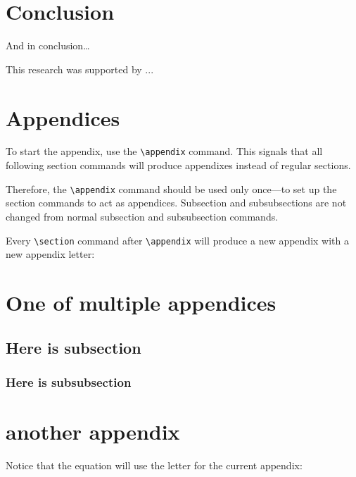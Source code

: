 \documentclass[reprint]{JASA}
\begin{document}
\section{\label{sec:5}Conclusion}

And in conclusion\ldots

\begin{acknowledgments}
This research was supported by  ...
\end{acknowledgments}



\section{Appendices}

To start the appendix, use the \verb+\appendix+ command.
This signals that all following section commands will produce appendixes
instead of regular sections. 

Therefore, the \verb+\appendix+ command
should be used only once---to set up the section commands to act as
appendices. Subsection and subsubsections are not changed from normal subsection
and subsubsection commands.

Every \verb+\section+ command after \verb+\appendix+ will produce a new appendix with 
a new appendix letter:

\appendix
\section{One of multiple appendices}
\subsection{Here is subsection}
\subsubsection{Here is subsubsection}


\section{another appendix}
Notice that the equation will use the letter for the current appendix:
\end{document}
